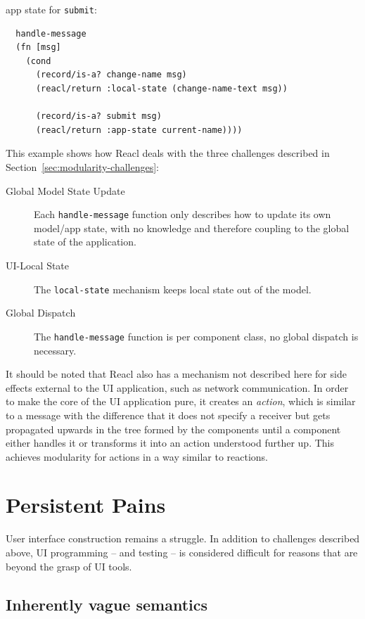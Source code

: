\documentclass[sigplan,screen]{acmart}
\begin{document}
app state for \texttt{submit}:
%
\begin{verbatim}
  handle-message
  (fn [msg]
    (cond
      (record/is-a? change-name msg)
      (reacl/return :local-state (change-name-text msg))

      (record/is-a? submit msg)
      (reacl/return :app-state current-name))))
\end{verbatim}
%
This example shows how Reacl deals with the three challenges described
in Section~\ref{sec:modularity-challenges}:
%
\begin{description}
\item[Global Model State Update] Each \texttt{handle-message} function
  only describes how to update its own model/app state, with no
  knowledge and therefore coupling to the global state of the
  application.
\item[UI-Local State] The \texttt{local-state} mechanism keeps local
  state out of the model.
\item[Global Dispatch] The \texttt{handle-message} function is per
  component class, no global dispatch is necessary.
\end{description}
%
It should be noted that Reacl also has a mechanism not described here
for side effects external to the UI application, such as network
communication.  In order to make the core of the UI application pure,
it creates an \textit{action}, which is similar to a message with the
difference that it does not specify a receiver but gets propagated
upwards in the tree formed by the components until a component either
handles it or transforms it into an action understood further up.
This achieves modularity for actions in a way similar to reactions.

\section{Persistent Pains}
\label{sec:persistent-pains}

User interface construction remains a struggle. In addition to
challenges described above, UI programming -- and testing -- is
considered difficult for reasons that are beyond the grasp of UI
tools.

\subsection{Inherently vague semantics}
\label{sec:vague-semantics}
\end{document}
